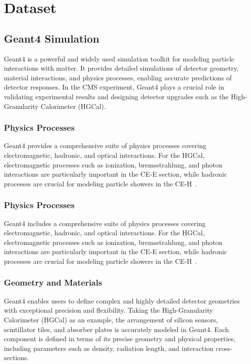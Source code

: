 \chapter{Dataset}

\section{Geant4 Simulation}

Geant4 is a powerful and widely used simulation toolkit for modeling particle interactions with matter. It provides detailed simulations of detector geometry, material interactions, and physics processes, enabling accurate predictions of detector responses. In the CMS experiment, Geant4 plays a crucial role in validating experimental results and designing detector upgrades such as the High-Granularity Calorimeter (HGCal).

\subsection{Physics Processes}

Geant4 provides a comprehensive suite of physics processes covering electromagnetic,
hadronic, and optical interactions. For the HGCal, electromagnetic processes such as
ionization, bremsstrahlung, and photon interactions are particularly important in the
CE-E section, while hadronic processes are crucial for modeling particle showers in
the CE-H~\cite{geant4_toolkit}.

\subsection{Physics Processes}

Geant4 includes a comprehensive suite of physics processes covering electromagnetic, hadronic, and optical interactions. For the HGCal, electromagnetic processes such as ionization, bremsstrahlung, and photon interactions are particularly important in the CE-E section, while hadronic processes are crucial for modeling particle showers in the CE-H~\cite{geant4_toolkit}.

\subsection{Geometry and Materials}

Geant4 enables users to define complex and highly detailed detector geometries with exceptional precision and flexibility. Taking the High-Granularity Calorimeter (HGCal) as an example, the arrangement of silicon sensors, scintillator tiles, and absorber plates is accurately modeled in Geant4. Each component is defined in terms of its precise geometry and physical properties, including parameters such as density, radiation length, and interaction cross-sections.

